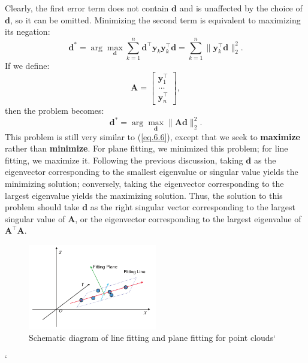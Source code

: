 Clearly, the first error term does not contain $\mathbf{d}$ and is unaffected by the choice of $\mathbf{d}$, so it can be omitted. Minimizing the second term is equivalent to maximizing its negation:
\begin{equation}\label{key}
	\mathbf{d}^* = \arg \max_{\mathbf{d}} \sum_{k=1}^{n} \mathbf{d}^\top \mathbf{y}_k\mathbf{y}_k^\top \mathbf{d} = \sum_{k=1}^{n} \| \mathbf{y}_k^\top \mathbf{d}\|_2^2.
\end{equation}
If we define:
\begin{equation}\label{key}
	\mathbf{A} = \begin{bmatrix}
		\mathbf{y}_1^\top \\
		\ldots \\
		\mathbf{y}_n^\top
	\end{bmatrix},
\end{equation}
then the problem becomes:
\begin{equation}\label{eq.6.33}
	\mathbf{d}^* = \arg \max_{\mathbf{d}} \| \mathbf{A} \mathbf{d} \|_2^2.
\end{equation}
This problem is still very similar to (\ref{eq.6.6}), except that we seek to \textbf{maximize} rather than \textbf{minimize}. For plane fitting, we minimized this problem; for line fitting, we maximize it. Following the previous discussion, taking $\mathbf{d}$ as the eigenvector corresponding to the smallest eigenvalue or singular value yields the minimizing solution; conversely, taking the eigenvector corresponding to the largest eigenvalue yields the maximizing solution. Thus, the solution to this problem should take $\mathbf{d}$ as the right singular vector corresponding to the largest singular value of $\mathbf{A}$, or the eigenvector corresponding to the largest eigenvalue of $\mathbf{A}^\top \mathbf{A}$.

\begin{figure}[!htp]
	\centering
	\includegraphics[width=0.5\textwidth]{resources/basic-point-cloud/linear-fitting.pdf}
	\caption{Schematic diagram of line fitting and plane fitting for point clouds`}
	\label{fig:linear-fitting}
\end{figure}
`
